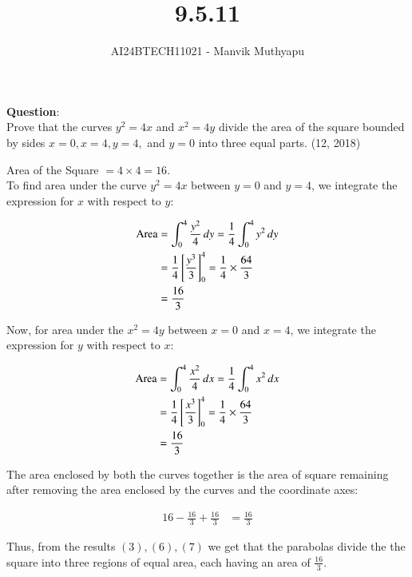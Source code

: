 \documentclass[journal,12pt,onecolumn]{IEEEtran}
\title{9.5.11}
\author{AI24BTECH11021 - Manvik Muthyapu}
\theoremstyle{remark}
\begin{document}


\maketitle
\bigskip

\renewcommand{\thefigure}{\theenumi}
\renewcommand{\thetable}{\theenumi}


\textbf{Question}:\\
Prove that the curves $y^2 = 4x$ and $x^2 = 4y$ divide the area of the square bounded by sides $x=0, x=4, y=4,$ and $y=0$ into three equal parts.
\hfill{(12, 2018)}

\solution
Area of the Square $= 4 \times 4 = 16$.\\
To find area under the curve $y^2 = 4x$ between $y = 0$ and $y = 4$, we integrate the expression for $x$ with respect to $y$:

\begin{align}
	\text{Area} &= \int_0^4 \frac{y^2}{4} \, dy = \frac{1}{4} \int_0^4 y^2 \, dy \\
	&= \frac{1}{4} {}\left[\frac{y^3}{3}\right]_0^4 = \frac{1}{4} \times \frac{64}{3} \\
	&= \frac{16}{3}
\end{align}

Now, for area under the $x^2 = 4y$ between $x = 0$ and $x = 4$, we integrate the expression for $y$ with respect to $x$:

\begin{align}
	\text{Area} &= \int_0^4 \frac{x^2}{4} \, dx = \frac{1}{4} \int_0^4 x^2 \, dx \\
	&= \frac{1}{4} {}\left[\frac{x^3}{3}\right]_0^4 = \frac{1}{4} \times \frac{64}{3} \\
	&= \frac{16}{3}
\end{align}

The area enclosed by both the curves together is the area of square remaining after removing the area enclosed by the curves and the coordinate axes:

\begin{align}
	16 - \frac{16}{3} + \frac{16}{3} &= \frac{16}{3}
\end{align}

Thus, from the results $(3),(6),(7)$ we get that the parabolas divide the the square into three regions of equal area, each having an area of $\frac{16}{3}$.
\end{document}
